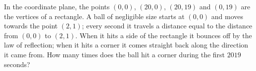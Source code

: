 In the coordinate plane, the points $(0,0)$, $(20,0)$, $(20,19)$ and $(0,19)$ are the vertices of a rectangle. A ball of negligible size starts at $(0,0)$ and moves towards the point $(2,1)$; every second it travels a distance equal to the distance from $(0,0)$ to $(2,1)$. When it hits a side of the rectangle it bounces off by the law of reflection; when it hits a corner it comes straight back along the direction it came from. How many times does the ball hit a corner during the first $2019$ seconds?
